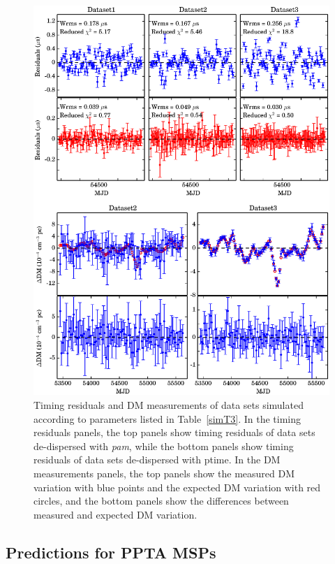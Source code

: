 \documentclass[useAMS,usenatbib]{mn2e}
\begin{document}
\begin{figure}
\center
\includegraphics[width=6.5 in]{sim3.ps}
\caption{Timing residuals and DM measurements of data sets simulated according to parameters 
listed in Table~\ref{simT3}. In the timing residuals panels, the top panels show timing residuals 
of data sets de-dispersed with \textit{pam}, while the bottom panels show timing residuals of data 
sets de-dispersed with ptime. In the DM measurements panels, the top panels show the measured DM 
variation with blue points and the expected DM variation with red circles, and 
the bottom panels show the differences between measured and expected DM variation.}
\label{sim3}
\end{figure}

\subsection{Predictions for PPTA MSPs}
\end{document}
